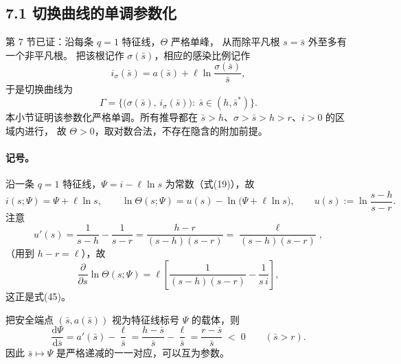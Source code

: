 
\subsection*{7.1 切换曲线的单调参数化}

第 7 节已证：沿每条 $q=1$ 特征线，$\Theta$ 严格单峰，
从而除平凡根 $s=\bar s$ 外至多有一个非平凡根。
把该根记作 $\sigma(\bar s)$，相应的感染比例记作
\begin{equation}
  i_\sigma(\bar s)=a(\bar s)+\ell\ln\frac{\sigma(\bar s)}{\bar s},
  \label{eq:isigma-def}
\end{equation}
于是切换曲线为
\begin{equation}
  \Gamma=\bigl\{\bigl(\sigma(\bar s),\,i_\sigma(\bar s)\bigr):\ \bar s\in(h,\bar s^{*})\bigr\}.
  \label{eq:Gamma-param}
\end{equation}
本小节证明该参数化严格单调。所有推导都在
$\bar s>h$、$\sigma>\bar s>h>r$、$i>0$ 的区域内进行，
故 $\Theta>0$，取对数合法，不存在隐含的附加前提。

\paragraph{记号。}
沿一条 $q=1$ 特征线，$\Psi=i-\ell\ln s$ 为常数（式(19)），故
\begin{equation}
  i(s;\Psi)=\Psi+\ell\ln s,
  \qquad
  \ln\Theta(s;\Psi)=u(s)-\ln\bigl(\Psi+\ell\ln s\bigr),
  \qquad
  u(s):=\ln\frac{s-h}{s-r}.
  \label{eq:lnTheta}
\end{equation}
注意
\begin{equation}
  u'(s)=\frac{1}{s-h}-\frac{1}{s-r}=\frac{h-r}{(s-h)(s-r)}=\frac{\ell}{(s-h)(s-r)},
  \label{eq:uprime}
\end{equation}
（用到 $h-r=\ell$），故
\begin{equation}
  \frac{\partial}{\partial s}\ln\Theta(s;\Psi)
  =\ell\left[\frac{1}{(s-h)(s-r)}-\frac{1}{s\,i}\right],
  \label{eq:dlnTheta-ds}
\end{equation}
这正是式(45)。

\begin{lemma}
\label{lem:Psi-along-dA}
把安全端点 $(\bar s,a(\bar s))$ 视为特征线标号 $\Psi$ 的载体，则
\begin{equation}
  \frac{\mathrm{d}\Psi}{\mathrm{d}\bar s}
  =a'(\bar s)-\frac{\ell}{\bar s}
  =\frac{h-\bar s}{\bar s}-\frac{\ell}{\bar s}
  =\frac{r-\bar s}{\bar s}\;<\;0
  \qquad(\bar s>r).
  \label{eq:dPsi-dsbar}
\end{equation}
因此 $\bar s\mapsto\Psi$ 是严格递减的一一对应，可以互为参数。
\end{lemma}

